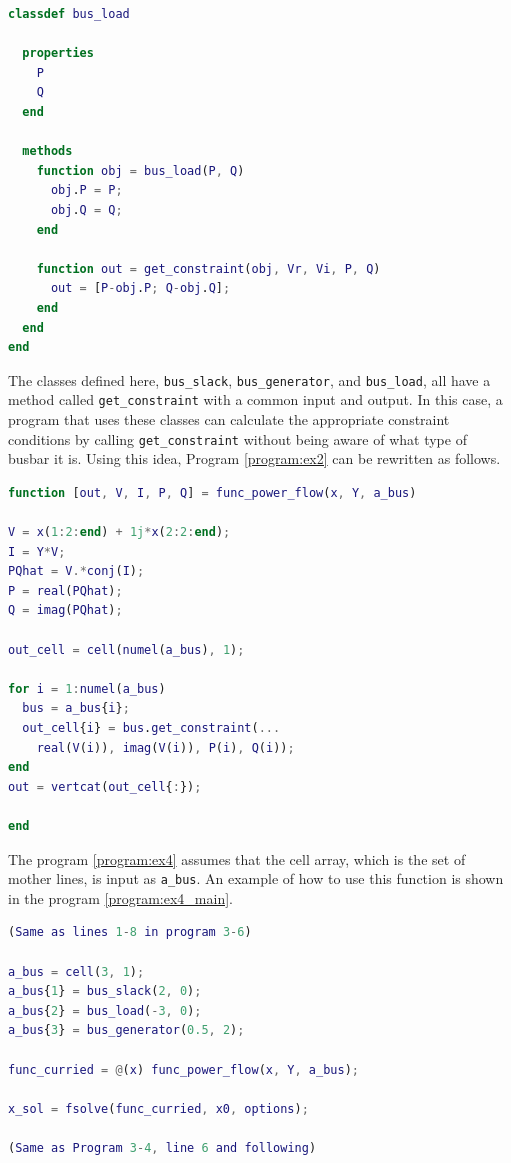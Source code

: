 \documentclass[graybox, envcountchap]{svmult}
\begin{document}
\begin{example}
\begin{lstlisting}[language=Matlab, caption=bus\_load.m, label={program:bus_PQ}]
classdef bus_load
  
  properties
    P
    Q
  end
  
  methods
    function obj = bus_load(P, Q)
      obj.P = P;
      obj.Q = Q;
    end
    
    function out = get_constraint(obj, Vr, Vi, P, Q)
      out = [P-obj.P; Q-obj.Q];
    end
  end
end
\end{lstlisting}

The classes defined here, \verb|bus_slack|, \verb|bus_generator|, and
\verb|bus_load|, all have a method called \verb|get_constraint| with a common
input and output. In this case, a program that uses these classes can calculate
the appropriate constraint conditions by calling \verb|get_constraint| without
being aware of what type of busbar it is. Using this idea, Program
\ref{program:ex2} can be rewritten as follows.

\begin{lstlisting}[language=Matlab, caption=func\_power\_flow.m, label={program:ex4}]
function [out, V, I, P, Q] = func_power_flow(x, Y, a_bus)

V = x(1:2:end) + 1j*x(2:2:end);
I = Y*V;
PQhat = V.*conj(I);
P = real(PQhat);
Q = imag(PQhat);

out_cell = cell(numel(a_bus), 1);

for i = 1:numel(a_bus)
  bus = a_bus{i};
  out_cell{i} = bus.get_constraint(...
    real(V(i)), imag(V(i)), P(i), Q(i));
end
out = vertcat(out_cell{:});

end
\end{lstlisting}

The program \nobreak\ref{program:ex4} assumes that the cell array, which is the
set of mother lines, is input as \verb|a_bus|. An example of how to use this
function is shown in the program \nobreak\ref{program:ex4_main}.

\begin{lstlisting}[language=Matlab, caption=main\_ex4.m, label={program:ex4_main}]
(Same as lines 1-8 in program 3-6)

a_bus = cell(3, 1);
a_bus{1} = bus_slack(2, 0);
a_bus{2} = bus_load(-3, 0);
a_bus{3} = bus_generator(0.5, 2);

func_curried = @(x) func_power_flow(x, Y, a_bus);

x_sol = fsolve(func_curried, x0, options);

(Same as Program 3-4, line 6 and following)
\end{lstlisting}


\end{example}
\end{document}
